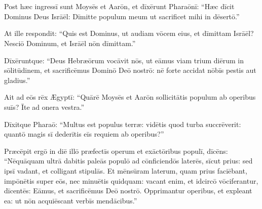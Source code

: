 \chapter{}
\thispagestyle{empty}

Post hæc ingressī sunt Moysēs
et Aarōn, et dīxērunt Pharaōnī: ``Hæc dīcit Dominus Deus
Isrāēl: Dīmitte populum meum ut
sacrificet mihi in dēsertō.''

At ille respondit: ``Quis est
Dominus, ut audiam vōcem eius, et dīmittam Isrāēl? Nesciō
Dominum, et Isrāēl nōn dīmittam.''

Dīxēruntque: ``Deus
Hebræōrum vocāvit nōs, ut eāmus viam trium diērum in
sōlitūdinem, et
sacrificēmus Dominō Deō nostrō: nē forte accidat nōbīs
pestis aut
gladius.''

Ait ad eōs rēx Ægyptī: ``Quārē
Moysēs et Aarōn sollicitātis populum ab
operibus suīs? Īte ad onera vestra.''

Dīxitque
Pharaō: ``Multus est populus terræ: vidētis quod turba
succrēverit: quantō magis sī dederītis eīs
requiem ab operibus?'' 


Præcēpit ergō in diē illō
præfectīs operum et exāctōribus populī,
dīcēns:  ``Nēquā\-quam ultrā dabitis paleās
populō ad cōnficiendōs laterēs, sīcut prius: sed ipsī vadant, et colligant stipulās. 
Et mēnsūram laterum, quam prius faciēbant, impōnētis super eōs, nec
minuētis quidquam: vacant enim, et
idcircō vōciferantur, dīcentēs: Eāmus, et sacrificēmus
Deō nostrō.  Opprimantur operibus, et expleant ea: ut nōn
acquiēscant verbīs
mendācibus.''

